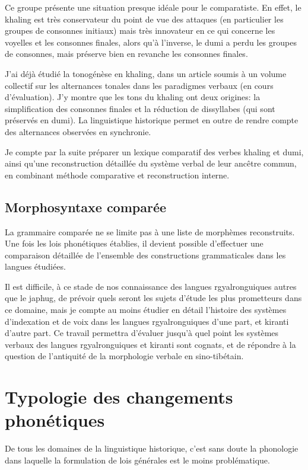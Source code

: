 \documentclass[oldfontcommands,oneside,a4paper,11pt]{article}
\begin{document}
Ce groupe présente une situation presque idéale pour le comparatiste. En effet, le khaling est très conservateur du point de vue des attaques (en particulier les groupes de consonnes initiaux) mais très innovateur en ce qui concerne les voyelles et les consonnes finales, alors qu'à l'inverse, le dumi a perdu les groupes de consonnes, mais préserve bien en revanche les consonnes finales. 


J'ai déjà étudié la tonogénèse en khaling, dans un article soumis à un volume collectif sur les alternances tonales dans les paradigmes verbaux (en cours d'évaluation). J'y montre que les tons du khaling ont deux origines: la simplification des consonnes finales et la réduction de dissyllabes (qui sont préservés en dumi). La linguistique historique permet en outre de rendre compte des alternances observées en synchronie.

Je compte par la suite préparer un lexique comparatif des verbes khaling et dumi, ainsi qu'une reconstruction détaillée du système verbal de leur ancêtre commun, en combinant méthode comparative et reconstruction interne.

\subsection{Morphosyntaxe comparée}
La grammaire comparée ne se limite pas à une liste de morphèmes reconstruits. Une fois les lois phonétiques établies, il devient possible d'effectuer une comparaison détaillée de l'ensemble des constructions grammaticales dans les langues étudiées.

Il est difficile, à ce stade de nos connaissance des langues rgyalronguiques autres que le japhug, de prévoir quels seront les sujets d'étude les plus prometteurs dans ce domaine, mais je compte au moins étudier en détail l'histoire des systèmes d'indexation et de voix dans les langues rgyalronguiques d'une part, et kiranti d'autre part. Ce travail permettra d'évaluer jusqu'à quel point les systèmes verbaux des langues rgyalronguiques et kiranti sont cognats, et de répondre à la question de l'antiquité de la morphologie verbale en sino-tibétain.

\section{Typologie des changements phonétiques } \label{sec:phonetique}
De tous les domaines de la linguistique historique, c'est sans doute la phonologie dans laquelle la formulation de lois générales est le moins problématique. 
\end{document}
